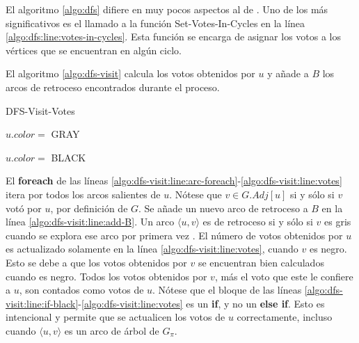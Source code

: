 
El algoritmo \ref{algo:dfs} difiere en muy pocos aspectos al de \cite{intro-to-algo-3}. Uno de los m\'as significativos es el llamado a la funci\'on Set-Votes-In-Cycles en la l\'inea \ref{algo:dfs:line:votes-in-cycles}. Esta funci\'on se encarga de asignar los votos a los v\'ertices que se encuentran en alg\'un ciclo.  

El algoritmo \ref{algo:dfs-visit} calcula los votos obtenidos por $u$ y a\~nade a $B$ los arcos de retroceso encontrados durante el proceso.

\begin{algorithm}[!h]
    \caption{DFS-Visit-Votes}
    \label{algo:dfs-visit}
    \DontPrintSemicolon
    \SetAlgoLined
    \BlankLine

    $u.color =$ GRAY\;

    $u.color =$ BLACK\;
\end{algorithm}

El \textbf{foreach} de las l\'ineas \ref{algo:dfs-visit:line:arc-foreach}-\ref{algo:dfs-visit:line:votes} itera por todos los arcos salientes de $u$. N\'otese que $v \in G.Adj[u]$ si y s\'olo si $v$ vot\'o por $u$, por definici\'on de $G$.  Se a\~nade un nuevo arco de retroceso a $B$ en la l\'inea \ref{algo:dfs-visit:line:add-B}. Un arco $\langle u, v \rangle$ es de retroceso si y s\'olo si $v$ es gris cuando se explora ese arco por primera vez \citep{intro-to-algo-3}. El n\'umero de votos obtenidos por $u$ es actualizado solamente en la l\'inea \ref{algo:dfs-visit:line:votes}, cuando $v$ es negro. Esto se debe a que los votos obtenidos por $v$ se encuentran bien calculados cuando es negro. Todos los votos obtenidos por $v$, m\'as el voto que este le confiere a $u$, son contados como votos de  $u$. N\'otese que el bloque de las l\'ineas \ref{algo:dfs-visit:line:if-black}-\ref{algo:dfs-visit:line:votes} es un \textbf{if}, y no un \textbf{else if}. Esto es intencional y permite que se actualicen los votos de $u$ correctamente, incluso cuando $\langle u, v \rangle$ es un arco de \'arbol de $G_\pi$.

